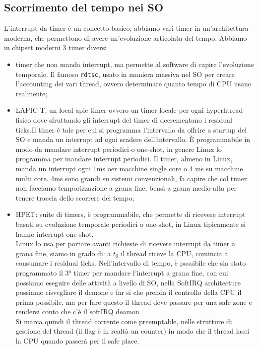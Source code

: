\documentclass[12pt, oneside]{extbook}
\begin{document}
\subsection{Scorrimento del tempo nei SO}
L'interrupt da timer è un concetto basico, abbiamo vari timer in un'architettura moderna, che permettono di avere un'evoluzione articolata del tempo. Abbiamo in chipset moderni 3 timer diversi
\begin{itemize}
\item timer che non manda interrupt, ma permette al software di capire l'evoluzione temporale. Il famoso \texttt{rdtsc}, usato in maniera massiva nel SO per creare l'accounting dei vari thread, ovvero determinare quanto tempo di CPU usano realmente;
\item LAPIC-T, un local apic timer ovvero un timer locale per ogni hyperhtread fisico dove sfruttando gli interrupt del timer di decrementano i residual ticks.Il timer è tale per cui si programma l'intervallo da offrire a startup del SO e manda un interrupt ad ogni scadere dell'intervallo. È programmabile in modo da mandare interrupt periodici o one-shot, in genere Linux lo programma per mandare interrupt periodici. Il timer, almeno in Linux, manda un interrupt ogni 1ms oer macchine single core o 4 ms su macchine multi core. 4ms sono grandi su sistemi convenzionali, fa capire che col timer non facciamo temporizzazione a grana fine, bensì a grana medio-alta per tenere traccia dello scorrere del tempo;
\item HPET: suite di timers, è programmabile, che permette di ricevere interrupt basati su evoluzione temporale periodici o one-shot, in Linux tipicamente si hanno interrupt one-shot.\\Linux lo usa per portare avanti richieste di ricevere interrupt da timer a grana fine, siamo in grado di:
a $t_0$ il thread riceve la CPU, comincia a consumare i residual ticks. Nell'intervallo di tempo, è possibile che sia stato programmato il 3° timer per mandare l'interrupt a grana fine, con cui possiamo eseguire delle attività a livello di SO, nella SoftIRQ architecture possiamo risvegliare il demone e far si che prenda il controllo della CPU il prima possibile, ma per fare questo il thread deve passare per una safe zone e rendersi conto che c'è il softIRQ deamon.\\Si marca quindi il thread corrente come preemptable, nelle strutture di gestione del thread (il flag è in realtà un counter) in modo che il thread lasci la CPU quando passerà per il safe place. 
\end{itemize}
\end{document}
